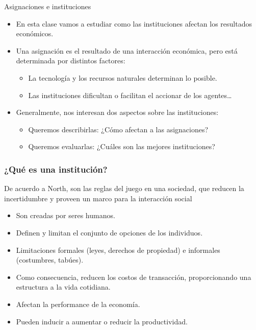 \documentclass{beamer}
\begin{document}
\begin{frame}{Asignaciones e instituciones}
    \begin{itemize}
        \item En esta clase vamos a estudiar como las instituciones afectan los resultados económicos. \vspace{2mm}
        \item Una asignación es el resultado de una interacción económica, pero está determinada por distintos factores: \vspace{2mm}
        \begin{itemize}
            \item La tecnología y los recursos naturales determinan lo posible. \vspace{2mm}
            \item Las instituciones dificultan o facilitan el accionar de los agentes\dots \vspace{2mm}
        \end{itemize}
        \item Generalmente, nos interesan dos aspectos sobre las instituciones: \vspace{2mm}
        \begin{itemize}
            \item Queremos describirlas: ¿Cómo afectan a las asignaciones? \vspace{2mm}
            \item Queremos evaluarlas: ¿Cuáles son las mejores instituciones?
        \end{itemize}
    \end{itemize} 
\end{frame}

\begin{frame}
\frametitle{¿Qué es una institución?}
De acuerdo a North, son las reglas del juego en una sociedad, que reducen la incertidumbre y proveen un marco para la interacción social \vspace{1mm}
    \begin{itemize}
        \item Son creadas por seres humanos. \vspace{1mm}
        \item Definen y limitan el conjunto de opciones de los individuos. \vspace{1mm}
        \item Limitaciones formales (leyes, derechos de propiedad) e informales (costumbres, tabúes).\vspace{1mm}
        \item Como consecuencia, reducen los costos de transacción, proporcionando una estructura a la vida cotidiana.\vspace{1mm}
        \item Afectan la performance de la economía. \vspace{1mm}
        \item Pueden inducir a aumentar o reducir la productividad.
        \end{itemize} 
 
\end{frame}
\end{document}
